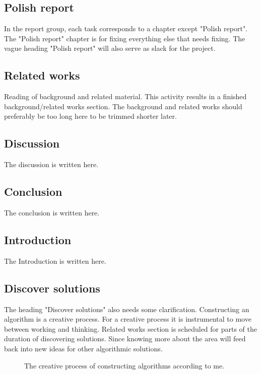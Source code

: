 \documentclass[msc,lith,english]{liuthesis}
\begin{document}
\subsection{Polish report}
In the report group, each task corresponds to a chapter except "Polish report".
The "Polish report" chapter is for fixing everything else that needs fixing.
The vague heading "Polish report" will also serve as slack for the project.

\subsection{Related works}
Reading of background and related material. This activity results in a finished background/related works section.
The background and related works should preferably be too long here to be trimmed shorter later.

\subsection{Discussion}
The discussion is written here.

\subsection{Conclusion}
The conclusion is written here.

\subsection{Introduction}
The Introduction is written here.

\subsection{Discover solutions}
The heading "Discover solutions" also needs some clarification. Constructing
an algorithm is a creative process. For a creative process it is instrumental
to move between working and thinking. Related works section is scheduled for
parts of the duration of discovering solutions. Since knowing more about the
area will feed back into new ideas for other algorithmic solutions. 

\begin{center}
\begin{figure}[h]
\centering
{}
\caption{The creative process of constructing algorithms according to me.}
\label{figCreativeProcess}
\end{figure}
\end{center}
\end{document}
